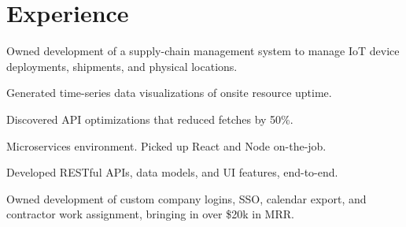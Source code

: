 \documentclass[]{deedy-resume-openfont}
\begin{document}
\begin{minipage}[t]{0.66\textwidth}


\section{Experience}
\sectionsep

\vspace{\topsep}
\begin{tightemize}

\item Owned development of a supply-chain management system to manage IoT device deployments, shipments, and physical locations.
\item Generated time-series data visualizations of onsite resource uptime.
\item Discovered API optimizations that reduced fetches by 50\%.

\end{tightemize}
\sectionsep


\begin{tightemize}


\item Microservices environment. Picked up React and Node on-the-job.
\item Developed RESTful APIs, data models, and UI features, end-to-end.
\item Owned development of custom company logins, SSO, calendar export, and contractor work assignment, bringing in over \$20k in MRR.

\end{tightemize}
\sectionsep


\end{minipage}
\end{document}
